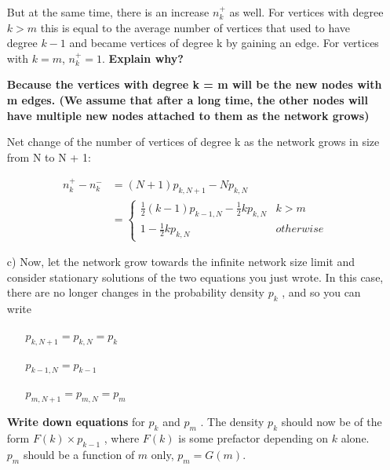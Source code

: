 \documentclass[a4paper,12pt]{article}
\begin{document}
\begin{itemize}
But at the same time, there is an increase $n^+_k$ as well. For vertices with degree $k > m$
this is equal to the average number of vertices that used to have degree $k - 1$ and became
vertices of degree k by gaining an edge. For vertices with $k = m$, $n^+_k = 1$.
\textbf{Explain why?}

\textbf{Because the vertices with degree k = m will be the new nodes with m edges. (We assume that after a long time, the other nodes will have multiple new nodes attached to them as the network grows)} 

Net change of the number of vertices of degree k as the network grows
in size from N to N + 1:  

\begin{equation}
  \begin{split}
    n^+_k - n^-_k  & = (N+1)p_{k,N+1} - Np_{k,N}\\ 
    & = 
    \begin{cases}
  \frac{1}{2}(k-1)p_{k-1,N} - \frac{1}{2}kp_{k,N}  & k > m\\    
   1 - \frac{1}{2}kp_{k,N} & otherwise    
\end{cases}
\end{split}
\end{equation}

\clearpage

\item[c) ] Now, let the network grow towards the infinite network size limit and consider
stationary solutions of the two equations you just wrote. In this case, there are no longer
changes in the probability density $p_k$ , and so you can write
\begin{itemize}
\item[] $p_{k,N+1} = p_{k,N} = p_k$
\item[] $p_{k-1,N} = p_{k-1}$
\item[] $p_{m,N +1} = p_{m,N} = p_m$
\end{itemize}

\textbf{Write down equations} for $p_k$ and $p_m$ . The density $p_k$ should now be of the
form $F(k) \times p_{k-1}$ , where $F(k)$ is some prefactor depending on $k$ alone. $p_m$ should be a function of $m$ only, $p_m = G(m)$.


\end{itemize}
\end{document}
